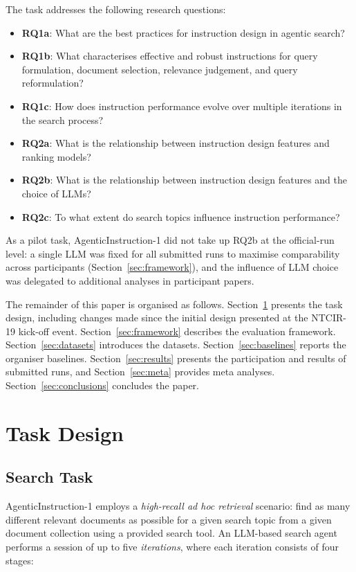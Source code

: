 \documentclass[sigconf,article]{acmart}
\begin{document}
The task addresses the following research questions:

\begin{itemize}
  \item \textbf{RQ1a}: What are the best practices for instruction design in
  agentic search?
  \item \textbf{RQ1b}: What characterises effective and robust instructions
  for query formulation, document selection, relevance judgement, and query
  reformulation?
  \item \textbf{RQ1c}: How does instruction performance evolve over multiple
  iterations in the search process?
  \item \textbf{RQ2a}: What is the relationship between instruction design
  features and ranking models?
  \item \textbf{RQ2b}: What is the relationship between instruction design
  features and the choice of LLMs?
  \item \textbf{RQ2c}: To what extent do search topics influence instruction
  performance?
\end{itemize}

As a pilot task, AgenticInstruction-1 did not take up RQ2b at the official-run
level: a single LLM was fixed for all submitted runs to maximise comparability
across participants (Section~\ref{sec:framework}), and the influence of LLM
choice was delegated to additional analyses in participant papers.

The remainder of this paper is organised as follows.
Section~\ref{sec:task} presents the task design, including changes made since
the initial design presented at the NTCIR-19 kick-off event.
Section~\ref{sec:framework} describes the evaluation framework.
Section~\ref{sec:datasets} introduces the datasets.
Section~\ref{sec:baselines} reports the organiser baselines.
Section~\ref{sec:results} presents the participation and results of submitted
runs, and Section~\ref{sec:meta} provides meta analyses.
Section~\ref{sec:conclusions} concludes the paper.

\section{Task Design}
\label{sec:task}

\subsection{Search Task}

AgenticInstruction-1 employs a \emph{high-recall ad hoc retrieval} scenario:
find as many different relevant documents as possible for a given search topic
from a given document collection using a provided search tool. An LLM-based
search agent performs a session of up to five \emph{iterations}, where each
iteration consists of four stages:
\end{document}
